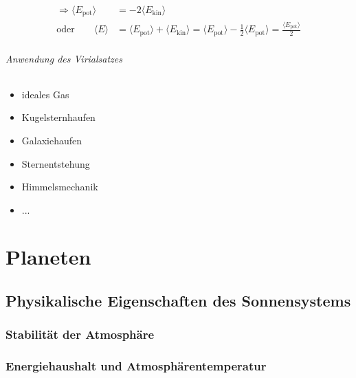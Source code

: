 \begin{align*}
    \Rightarrow \langle E_{\mathrm{pot}}\rangle &= -2 \langle E_{\mathrm{kin}} \rangle \\
    \text{oder}\qquad \langle E\rangle &= \langle E_{\mathrm{pot}} \rangle + \langle E_{\mathrm{kin}} \rangle = 
    \langle E_{\mathrm{pot}} \rangle - \frac{1}{2} \langle E_{\mathrm{pot}} \rangle = \frac{\langle E_{\mathrm{pot}} \rangle}{2}
\end{align*}

\paragraph{Anwendung des Virialsatzes}
\begin{itemize}
    \item ideales Gas
    \item Kugelsternhaufen
    \item Galaxiehaufen
    \item Sternentstehung
    \item Himmelsmechanik
    \item ...
\end{itemize}

\part{Planeten}
\chapter{Physikalische Eigenschaften des Sonnensystems}
\section{Stabilität der Atmosphäre}
\section{Energiehaushalt und Atmosphärentemperatur}

